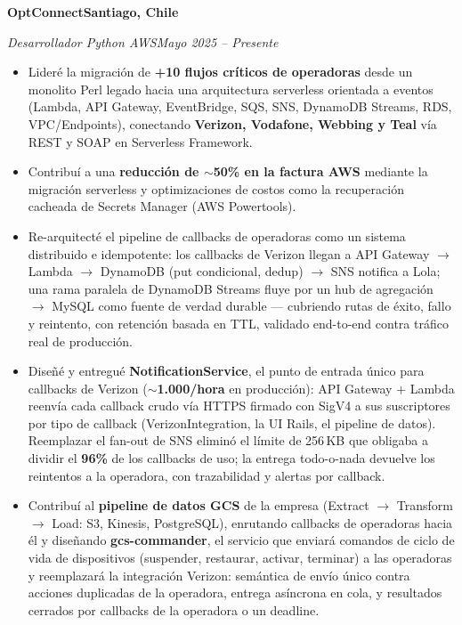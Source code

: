 \documentclass[11pt,a4paper]{article}
\newcommand{\entry}[4]{%
  \textbf{#1}\hfill\textbf{#2}\par
  \textit{#3}\hfill\textit{#4}\par\vspace{2pt}%
}
\begin{document}
\entry{OptConnect}{Santiago, Chile}{Desarrollador Python AWS}{Mayo 2025 -- Presente}
\begin{itemize}
  \item Lideré la migración de \textbf{+10 flujos críticos de operadoras} desde un monolito Perl
        legado hacia una arquitectura serverless orientada a eventos (Lambda, API Gateway,
        EventBridge, SQS, SNS, DynamoDB Streams, RDS, VPC/Endpoints), conectando
        \textbf{Verizon, Vodafone, Webbing y Teal} vía REST y SOAP en Serverless Framework.
  \item Contribuí a una \textbf{reducción de $\sim$50\% en la factura AWS} mediante la migración
        serverless y optimizaciones de costos como la recuperación cacheada de Secrets Manager
        (AWS Powertools).
  \item Re-arquitecté el pipeline de callbacks de operadoras como un sistema distribuido e
        idempotente: los callbacks de Verizon llegan a API Gateway $\to$ Lambda $\to$ DynamoDB
        (put condicional, dedup) $\to$ SNS notifica a Lola; una rama paralela de DynamoDB Streams
        fluye por un hub de agregación $\to$ MySQL como fuente de verdad durable --- cubriendo
        rutas de éxito, fallo y reintento, con retención basada en TTL, validado end-to-end
        contra tráfico real de producción.
  \item Diseñé y entregué \textbf{NotificationService}, el punto de entrada único para callbacks
        de Verizon ($\sim$\textbf{1.000/hora} en producción): API Gateway + Lambda reenvía cada
        callback crudo vía HTTPS firmado con SigV4 a sus suscriptores por tipo de callback
        (VerizonIntegration, la UI Rails, el pipeline de datos). Reemplazar el fan-out de SNS
        eliminó el límite de 256\,KB que obligaba a dividir el \textbf{96\%} de los callbacks de
        uso; la entrega todo-o-nada devuelve los reintentos a la operadora, con trazabilidad y
        alertas por callback.
  \item Contribuí al \textbf{pipeline de datos GCS} de la empresa (Extract $\to$ Transform $\to$
        Load: S3, Kinesis, PostgreSQL), enrutando callbacks de operadoras hacia él y diseñando
        \textbf{gcs-commander}, el servicio que enviará comandos de ciclo de vida de dispositivos
        (suspender, restaurar, activar, terminar) a las operadoras y reemplazará la integración
        Verizon: semántica de envío único contra acciones duplicadas de la operadora, entrega
        asíncrona en cola, y resultados cerrados por callbacks de la operadora o un deadline.

\end{itemize}
\end{document}
